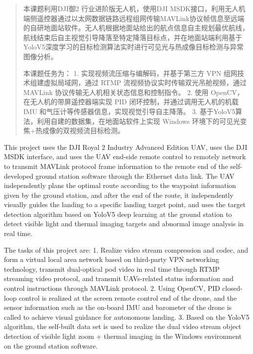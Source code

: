 \begin{abstract}
  本课题利用DJI御2 行业进阶版无人机，使用DJI MSDK接口，利用无人机端侧遥控器通过以太网数据链路远程组网传输MAVLink协议帧信息至远端的自研地面站软件。无人机根据地面站给出的航点信息自主规划最优航线，航线结束后自主视觉引导降落至特定降落目标点，并在地面站端利用基于YoloV5深度学习的目标检测算法实时进行可见光与热成像目标检测与异常图像分析。
  
  本课题任务为：
  1. 实现视频流压缩与编解码，并基于第三方 VPN 组网技术组建虚拟局域网，通过 RTMP 流视频协议实时传输双光吊舱视频，通过 MAVLink 协议传输无人机相关状态信息和控制指令。
  2. 使用 OpenCV，在无人机的带屏遥控器端实现 PID 闭环控制，并通过调用无人机的机载 IMU 和气压计等传感器信息，实现视觉引导自主降落。
  3. 基于YoloV5算法，利用自建的数据集，在地面站软件上实现 Windows 环境下的可见光变焦+热成像的双视频流目标检测。
\end{abstract}

\begin{enabstract}
  This project uses the DJI Royal 2 Industry Advanced Edition UAV, uses the DJI MSDK interface, and uses the UAV end-side remote control to remotely network to transmit MAVLink protocol frame information to the remote end of the self-developed ground station software through the Ethernet data link. The UAV independently plans the optimal route according to the waypoint information given by the ground station, and after the end of the route, it independently visually guides the landing to a specific landing target point, and uses the target detection algorithm based on YoloV5 deep learning at the ground station to detect visible light and thermal imaging targets and abnormal image analysis in real time.
  
  The tasks of this project are:
  1. Realize video stream compression and codec, and form a virtual local area network based on third-party VPN networking technology, transmit dual-optical pod video in real time through RTMP streaming video protocol, and transmit UAVs-related status information and control instructions through MAVLink protocol.
  2. Using OpenCV, PID closed-loop control is realized at the screen remote control end of the drone, and the sensor information such as the on-board IMU and barometer of the drone is called to achieve visual guidance for autonomous landing.
  3. Based on the YoloV5 algorithm, the self-built data set is used to realize the dual video stream object detection of visible light zoom + thermal imaging in the Windows environment on the ground station software.
\end{enabstract}
